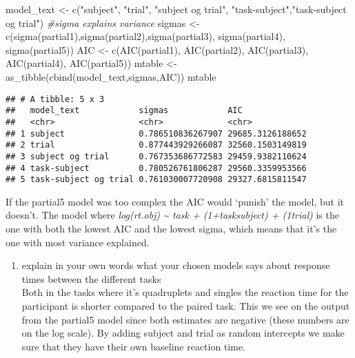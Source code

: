 \documentclass[
]{article}
\newenvironment{Shaded}{\begin{snugshade}}{\end{snugshade}}
\newcommand{\CommentTok}[1]{\textcolor[rgb]{0.56,0.35,0.01}{\textit{#1}}}
\newcommand{\FunctionTok}[1]{\textcolor[rgb]{0.00,0.00,0.00}{#1}}
\newcommand{\NormalTok}[1]{#1}
\newcommand{\OtherTok}[1]{\textcolor[rgb]{0.56,0.35,0.01}{#1}}
\newcommand{\StringTok}[1]{\textcolor[rgb]{0.31,0.60,0.02}{#1}}
\providecommand{\tightlist}{%
  \setlength{\itemsep}{0pt}\setlength{\parskip}{0pt}}
\begin{document}
\begin{Shaded}
\begin{Highlighting}[]
\NormalTok{model\_text }\OtherTok{\textless{}{-}} \FunctionTok{c}\NormalTok{(}\StringTok{"subject"}\NormalTok{, }\StringTok{"trial"}\NormalTok{, }\StringTok{"subject og trial"}\NormalTok{, }\StringTok{"task{-}subject"}\NormalTok{,}\StringTok{"task{-}subject og trial"}\NormalTok{)}
\CommentTok{\#sigma explains variance}
\NormalTok{sigmas }\OtherTok{\textless{}{-}} \FunctionTok{c}\NormalTok{(}\FunctionTok{sigma}\NormalTok{(partial1),}\FunctionTok{sigma}\NormalTok{(partial2),}\FunctionTok{sigma}\NormalTok{(partial3), }\FunctionTok{sigma}\NormalTok{(partial4), }\FunctionTok{sigma}\NormalTok{(partial5))}
\NormalTok{AIC }\OtherTok{\textless{}{-}} \FunctionTok{c}\NormalTok{(}\FunctionTok{AIC}\NormalTok{(partial1), }\FunctionTok{AIC}\NormalTok{(partial2), }\FunctionTok{AIC}\NormalTok{(partial3), }\FunctionTok{AIC}\NormalTok{(partial4), }\FunctionTok{AIC}\NormalTok{(partial5))}
\NormalTok{mtable }\OtherTok{\textless{}{-}} \FunctionTok{as\_tibble}\NormalTok{(}\FunctionTok{cbind}\NormalTok{(model\_text,sigmas,AIC))}
\NormalTok{mtable}
\end{Highlighting}
\end{Shaded}

\begin{verbatim}
## # A tibble: 5 x 3
##   model_text            sigmas            AIC             
##   <chr>                 <chr>             <chr>           
## 1 subject               0.786510836267907 29685.3126188652
## 2 trial                 0.877443929266087 32560.1503149819
## 3 subject og trial      0.767353686772583 29459.9382110624
## 4 task-subject          0.780526761806287 29560.3359953566
## 5 task-subject og trial 0.761030007720908 29327.6815811547
\end{verbatim}

If the partial5 model was too complex the AIC would `punish' the model,
but it doesn't. The model where \emph{log(rt.obj) \textasciitilde{} task
+ (1+task\textbar subject) + (1\textbar trial)} is the one with both the
lowest AIC and the lowest sigma, which means that it's the one with most
variance explained.

\begin{enumerate}
\def\labelenumi{\roman{enumi}.}
\setcounter{enumi}{1}
\tightlist
\item
  explain in your own words what your chosen models says about response
  times between the different tasks\\
  Both in the tasks where it's quadruplets and singles the reaction time
  for the participant is shorter compared to the paired task. This we
  see on the output from the partial5 model since both estimates are
  negative (these numbers are on the log scale). By adding subject and
  trial as random intercepts we make sure that they have their own
  baseline reaction time.
\end{enumerate}
\end{document}

